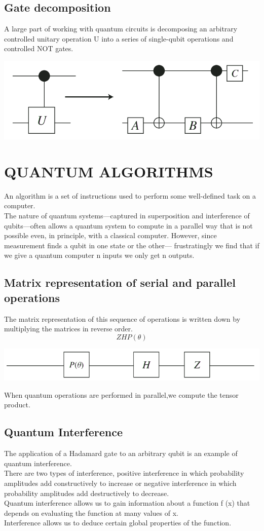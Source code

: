 \documentclass[12pt,oneside]{book}
\begin{document}
\section{Gate decomposition}
A large part of working with quantum circuits is decomposing an arbitrary controlled unitary operation U into a series of single-qubit operations and controlled NOT gates.
\begin{center}
    \includegraphics[width=0.3\linewidth]{../pic/3327/6.png}
\end{center}
\chapter{QUANTUM ALGORITHMS}
An algorithm is a set of instructions used to perform some well-defined task on a computer.\\
The nature of quantum systems—captured in superposition and interference of qubits—often allows a quantum system to compute in a parallel way that is not possible even, in principle, with a classical computer.
However, since measurement finds a qubit in one state or the other— frustratingly we find that if we give a quantum computer n inputs we only get n outputs.
\section{Matrix representation of serial and parallel operations}
The matrix representation of this sequence of operations is written down by multiplying the matrices in reverse order.
\[ZHP(\theta)\]
\begin{center}
    \includegraphics[width=0.5\linewidth]{../pic/3327/7.png}
\end{center}
When quantum operations are performed in parallel,we compute the tensor product.
\section{Quantum Interference}
The application of a Hadamard gate to an arbitrary qubit is an example of quantum interference.\\
There are two types of interference, positive interference in which probability amplitudes add constructively to increase or negative interference in which probability amplitudes add destructively to decrease.\\
Quantum interference allows us to gain information about a function f (x) that depends on evaluating the function at many values of x.\\
Interference allows us to deduce certain global properties of the function.
\end{document}

